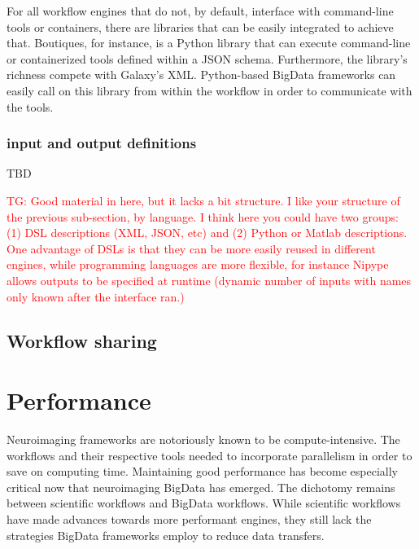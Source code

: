 \documentclass{report}
\newcommand{\tristan}[1]{\textcolor{red}{TG: #1}}
\begin{document}
            For all workflow engines that do not, by default, interface with 
            command-line tools or containers, there are libraries that can be
            easily integrated to achieve that. Boutiques, for instance, is a 
            Python library that can execute command-line or containerized tools
            defined within a JSON schema. Furthermore, the library's richness
            compete with Galaxy's XML. Python-based BigData frameworks can 
            easily call on this library from within the workflow in order to
            communicate with the tools.

            \subsection{input and output definitions}
                TBD

            \tristan{Good material in here, but it lacks a bit structure.
            I like your structure of the previous sub-section, by language. I think
            here you could have two groups: (1) DSL descriptions (XML, JSON, etc) and (2)
            Python or Matlab descriptions. One advantage of DSLs is that they can 
            be more easily reused in different engines, while programming languages
            are more flexible, for instance Nipype allows outputs to be specified
            at runtime (dynamic number of inputs with names only known after
            the interface ran.)}


        \section{Workflow sharing}\label{sharing}
            
            
    \chapter{Performance}\label{performance}
        Neuroimaging frameworks are notoriously known to be compute-intensive.
        The workflows and their respective tools needed to incorporate 
        parallelism in order to save on computing time. Maintaining good 
        performance has become especially critical now that neuroimaging
        BigData has emerged. The dichotomy remains between scientific 
        workflows and BigData workflows. While scientific workflows have made
        advances towards more performant engines, they still lack the 
        strategies BigData frameworks employ to reduce data transfers. 
        
\end{document}
